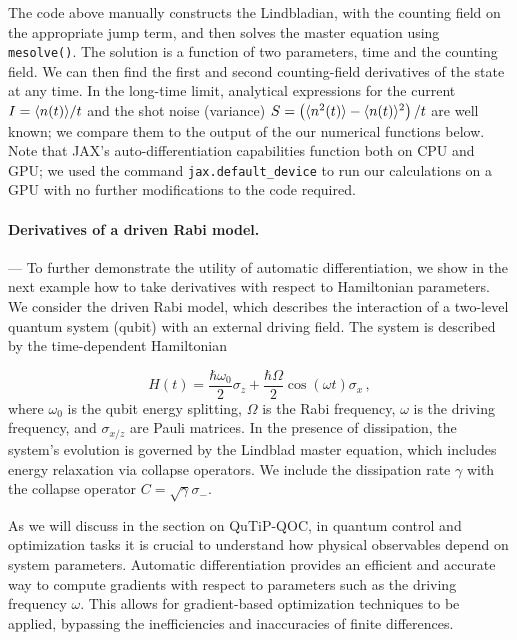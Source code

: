 \documentclass[preprint,3p,sort&compress]{elsarticle}
\def\code#1{\texttt{#1}}
\DeclarePairedDelimiter{\ex}{\langle}{\rangle}
\begin{document}
The code above manually constructs the Lindbladian, with the counting field on the appropriate jump term, and then solves the master equation using \code{mesolve()}. The solution is a function of two parameters, time and the counting field.  We can then find the first and second counting-field derivatives of the state at any time.  In the long-time limit, analytical expressions for the current $I= \ex{n(t)}/t $ and the shot noise (variance) $S = \left(\ex{n^2(t)} - \ex{n(t)}^2\right)/t$ are well known; we compare them to the output of the our numerical functions below. Note that JAX's auto-differentiation capabilities function both on CPU and GPU; we used the command \code{jax.default\_device} to run our calculations on a GPU with no further modifications to the code required.


\paragraph{Derivatives of a driven Rabi model.} --- To further demonstrate the utility of automatic differentiation, we show in the next example how to take derivatives with respect to Hamiltonian parameters. We consider the driven Rabi model, which describes the interaction of a two-level quantum system (qubit) with an external driving field. The system is described by the time-dependent Hamiltonian

\begin{equation}
H(t) = \frac{\hbar \omega_0}{2} \sigma_z + \frac{\hbar \Omega}{2} \cos(\omega t)\sigma_x \, ,
\end{equation}
where $\omega_0$ is the qubit energy splitting, $\Omega$ is the Rabi frequency, $\omega$ is the driving frequency, and $\sigma_{x/z}$ are Pauli matrices. In the presence of dissipation, the system's evolution is governed by the Lindblad master equation, which includes energy relaxation via collapse operators. We include the dissipation rate $\gamma$ with the collapse operator $C = \sqrt{\gamma} \sigma_-$.

As we will discuss in the section on QuTiP-QOC, in quantum control and optimization tasks it is crucial to understand how physical observables depend on system parameters. Automatic differentiation provides an efficient and accurate way to compute gradients with respect to parameters such as the driving frequency $\omega$. This allows for gradient-based optimization techniques to be applied, bypassing the inefficiencies and inaccuracies of finite differences.
\end{document}
